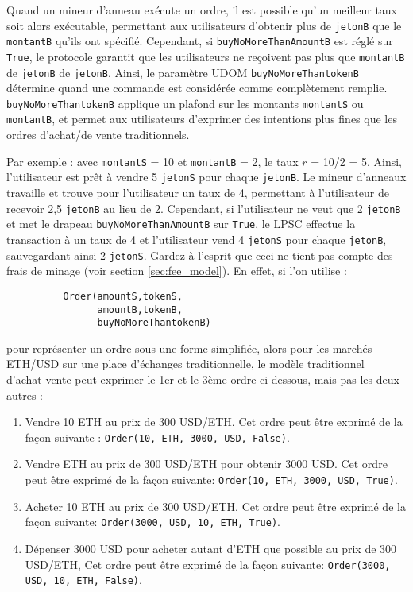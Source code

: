 \documentclass[UTF8,nofonts]{article}
\begin{document}
\begin{multicols}{2}
Quand un mineur d’anneau exécute un ordre, il est possible qu'un meilleur taux soit alors exécutable, permettant aux utilisateurs d'obtenir plus de \verb|jetonB| que le \verb|montantB| qu'ils ont spécifié. Cependant, si \verb|buyNoMoreThanAmountB| est réglé sur \verb|True|, le protocole garantit que les utilisateurs ne reçoivent pas plus que \verb|montantB| de \verb|jetonB| de \verb|jetonB|. Ainsi, le paramètre UDOM \verb|buyNoMoreThantokenB| détermine quand une commande est considérée comme complètement remplie. \verb|buyNoMoreThantokenB| applique un plafond sur les montants \verb|montantS| ou \verb|montantB|, et permet aux utilisateurs d'exprimer des intentions plus fines que les ordres d'achat/de vente traditionnels.

Par exemple : avec \verb|montantS| = 10 et \verb|montantB| = 2, le taux $r$ = 10/2 = 5. Ainsi, l'utilisateur est prêt à vendre 5 \verb|jetonS| pour chaque \verb|jetonB|. Le mineur d’anneaux travaille et trouve pour l'utilisateur un taux de 4, permettant à l'utilisateur de recevoir 2,5 \verb|jetonB| au lieu de 2. Cependant, si l'utilisateur ne veut que 2 \verb|jetonB| et met le drapeau \verb|buyNoMoreThanAmountB| sur \verb|True|, le LPSC effectue la transaction à un taux de 4 et l'utilisateur vend 4 \verb|jetonS| pour chaque \verb|jetonB|, sauvegardant ainsi 2 \verb|jetonS|. Gardez à l'esprit que ceci ne tient pas compte des frais de minage (voir section \ref{sec:fee_model}).
En effet, si l'on utilise :


\begin{verbatim}
	      Order(amountS,tokenS,
	            amountB,tokenB,
	            buyNoMoreThantokenB)
\end{verbatim}

pour représenter un ordre sous une forme simplifiée, alors pour les marchés ETH/USD sur une place d’échanges traditionnelle, le modèle traditionnel d'achat-vente peut exprimer le 1er et le 3ème ordre ci-dessous, mais pas les deux autres :

\begin{enumerate}
	\item Vendre 10 ETH au prix de 300 USD/ETH. Cet ordre peut être exprimé de la façon suivante : \verb|Order(10, ETH, 3000, USD, False)|.
	\item Vendre ETH au prix de 300 USD/ETH pour obtenir 3000 USD. Cet ordre peut être exprimé de la façon suivante: \verb|Order(10, ETH, 3000, USD, True)|.
	\item Acheter 10 ETH au prix de 300 USD/ETH, Cet ordre peut être exprimé de la façon suivante: \verb|Order(3000, USD, 10, ETH, True)|.
	\item Dépenser 3000 USD pour acheter autant d'ETH que possible au prix de 300 USD/ETH, Cet ordre peut être exprimé de la façon suivante: \verb|Order(3000, USD, 10, ETH, False)|.
\end{enumerate}




\end{multicols}
\end{document}
